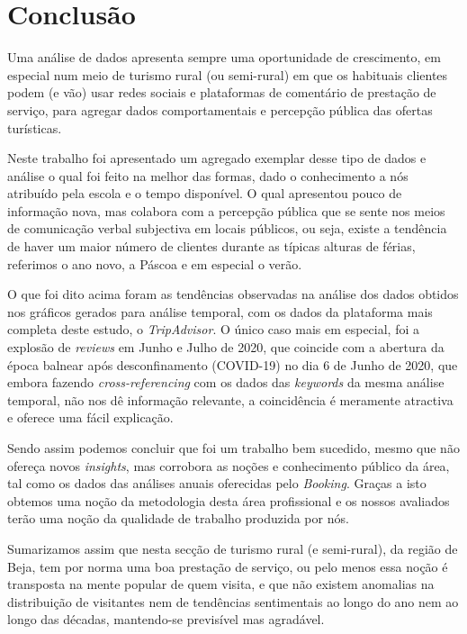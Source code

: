  \chapter{Conclusão}
\label{cap10}

Uma análise de dados apresenta sempre uma oportunidade de crescimento, em especial num meio de turismo rural (ou semi-rural) em que os habituais clientes podem (e vão) usar redes sociais e plataformas de comentário de prestação de serviço, para agregar dados comportamentais e percepção pública das ofertas turísticas.

Neste trabalho foi apresentado um agregado exemplar desse tipo de dados e análise o qual foi feito na melhor das formas, dado o conhecimento a nós atribuído pela escola e o tempo disponível. O qual apresentou pouco de informação nova, mas colabora com a percepção pública que se sente nos meios de comunicação verbal subjectiva em locais públicos, ou seja, existe a tendência de haver um maior número de clientes durante as típicas alturas de férias, referimos o ano novo, a Páscoa e em especial o verão.

O que foi dito acima foram as tendências observadas na análise dos dados obtidos nos gráficos gerados para análise temporal, com os dados da plataforma mais completa deste estudo, o \textit{TripAdvisor}. O único caso mais em especial, foi a explosão de \textit{reviews} em Junho e Julho de 2020, que coincide com a abertura da época balnear após desconfinamento (COVID-19) no dia 6 de Junho de 2020, que embora fazendo \textit{cross-referencing} com os dados das \textit{keywords} da mesma análise temporal, não nos dê informação relevante, a coincidência é meramente atractiva e oferece uma fácil explicação.

Sendo assim podemos concluir que foi um trabalho bem sucedido, mesmo que não ofereça novos \textit{insights}, mas corrobora as noções e conhecimento público da área, tal como os dados das análises anuais oferecidas pelo \textit{Booking}. Graças a isto obtemos uma noção da metodologia desta área profissional e os nossos avaliados terão uma noção da qualidade de trabalho produzida por nós.

Sumarizamos assim que nesta secção de turismo rural (e semi-rural), da região de Beja, tem por norma uma boa prestação de serviço, ou pelo menos essa noção é transposta na mente popular de quem visita, e que não existem anomalias na distribuição de visitantes nem de tendências sentimentais ao longo do ano nem ao longo das décadas, mantendo-se previsível mas agradável.